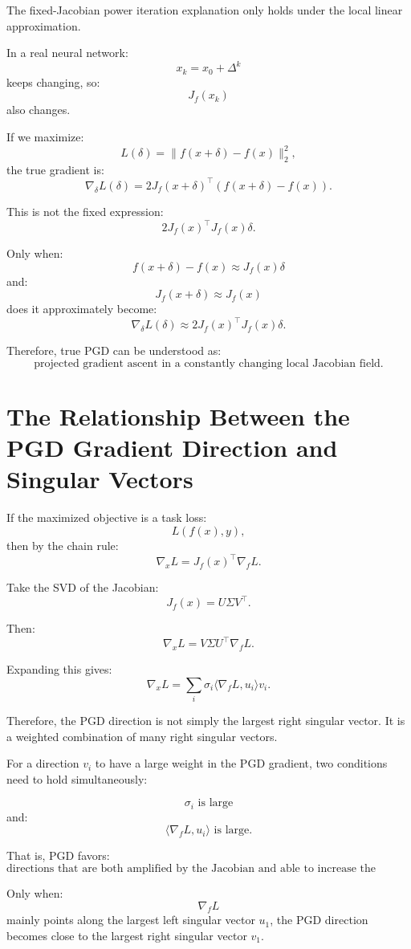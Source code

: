 \documentclass{article}
\begin{document}
The fixed-Jacobian power iteration explanation only holds under the local linear approximation.

In a real neural network:
\[
x_k=x_0+\Delta^k
\]
keeps changing, so:
\[
J_f(x_k)
\]
also changes.

If we maximize:
\[
L(\delta)
=
\|f(x+\delta)-f(x)\|_2^2,
\]
the true gradient is:
\[
\nabla_\delta L(\delta)
=
2J_f(x+\delta)^\top
\left(
f(x+\delta)-f(x)
\right).
\]

This is not the fixed expression:
\[
2J_f(x)^\top J_f(x)\delta.
\]

Only when:
\[
f(x+\delta)-f(x)\approx J_f(x)\delta
\]
and:
\[
J_f(x+\delta)\approx J_f(x)
\]
does it approximately become:
\[
\nabla_\delta L(\delta)
\approx
2J_f(x)^\top J_f(x)\delta.
\]

Therefore, true PGD can be understood as:
\[
\text{projected gradient ascent in a constantly changing local Jacobian field.}
\]

\section{The Relationship Between the PGD Gradient Direction and Singular Vectors}

If the maximized objective is a task loss:
\[
L(f(x),y),
\]
then by the chain rule:
\[
\nabla_x L
=
J_f(x)^\top \nabla_f L.
\]

Take the SVD of the Jacobian:
\[
J_f(x)=U\Sigma V^\top.
\]

Then:
\[
\nabla_x L
=
V\Sigma U^\top \nabla_f L.
\]

Expanding this gives:
\[
\nabla_x L
=
\sum_i
\sigma_i
\langle \nabla_f L,u_i\rangle
v_i.
\]

Therefore, the PGD direction is not simply the largest right singular vector. It is a weighted combination of many right singular vectors.

For a direction \(v_i\) to have a large weight in the PGD gradient, two conditions need to hold simultaneously:

\[
\sigma_i \text{ is large}
\]
and:
\[
\langle \nabla_f L,u_i\rangle \text{ is large}.
\]

That is, PGD favors:
\[
\text{directions that are both amplified by the Jacobian and able to increase the current loss.}
\]

Only when:
\[
\nabla_f L
\]
mainly points along the largest left singular vector \(u_1\), the PGD direction becomes close to the largest right singular vector \(v_1\).
\end{document}
